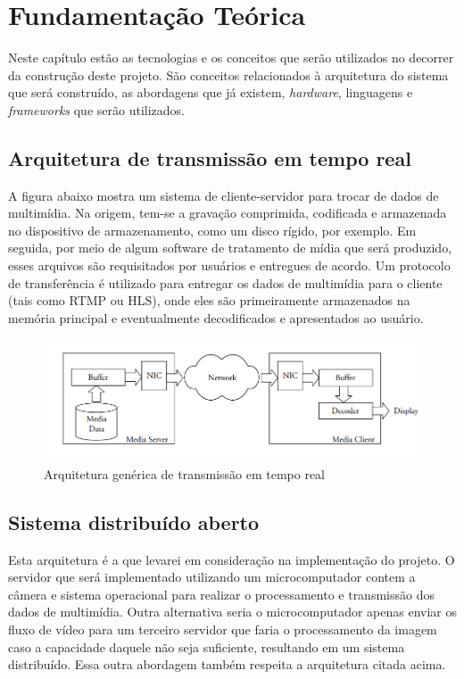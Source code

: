 \documentclass[12pt, %
openright, 
oneside, %
a4paper,    %
brazil]{facom-ufu-abntex2}
\begin{document}
\chapter{Fundamentação Teórica}

Neste capítulo estão as tecnologias e os conceitos que serão utilizados no
decorrer da construção deste projeto. São conceitos relacionados à arquitetura
do sistema que será construído, as abordagens que já existem, \emph{hardware},
linguagens e \emph{frameworks} que serão utilizados.

\section{Arquitetura de transmissão em tempo real}

A figura abaixo mostra um sistema de cliente-servidor para trocar de dados de
multimídia. Na origem, tem-se a gravação comprimida, codificada e armazenada no
dispositivo de armazenamento, como um disco rígido, por exemplo. Em seguida,
por meio de algum software de tratamento de mídia que será produzido, esses
arquivos são requisitados por usuários e entregues de acordo. Um protocolo de
transferência é utilizado para entregar os dados de multimídia para o cliente
(tais como RTMP ou HLS), onde eles são primeiramente armazenados na memória
principal e eventualmente decodificados e apresentados ao usuário.
\cite{lee2005scalable}

\begin{figure}[!ht]
	\centering
	\includegraphics[width=1\linewidth]{Capturar.PNG}
	\caption[Representação de um arquitetura de tempo real genérica]{Arquitetura genérica de transmissão em tempo real}
	\label{fig:graficosVariandoTamanhoRede}
\end{figure}

\section{Sistema distribuído aberto}

Esta arquitetura é a que levarei em consideração na implementação do projeto. O
servidor que será implementado utilizando um microcomputador contem a câmera e
sistema operacional para realizar o processamento e transmissão dos dados de
multimídia. Outra alternativa seria o microcomputador apenas enviar os fluxo de
vídeo para um terceiro servidor que faria o processamento da imagem caso a
capacidade daquele não seja suficiente, resultando em um sistema distribuído.
Essa outra abordagem também respeita a arquitetura citada acima.
\end{document}
